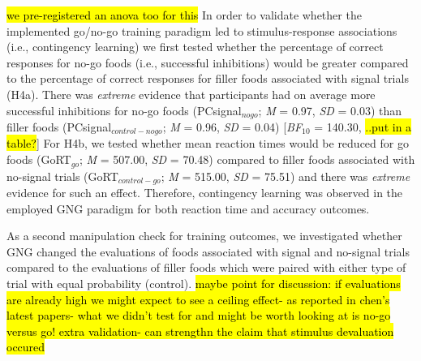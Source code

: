 \documentclass[man,floatsintext]{apa6}
\begin{document}
\par

\hl{we pre-registered an anova too for this} In order to validate
whether the implemented go/no-go training paradigm led to
stimulus-response associations (i.e., contingency learning) we first
tested whether the percentage of correct responses for no-go foods
(i.e., successful inhibitions) would be greater compared to the
percentage of correct responses for filler foods associated with signal
trials (H4a). There was \emph{extreme} evidence that participants had on
average more successful inhibitions for no-go foods
(PCsignal\(_{nogo}\); \emph{M} = 0.97, \emph{SD} = 0.03) than filler
foods (PCsignal\(_{control-nogo}\); \emph{M} = 0.96, \emph{SD} = 0.04)
{[}\emph{BF}\(_{10}\) = 140.30, \hl{..put in a table?}{]} For H4b, we
tested whether mean reaction times would be reduced for go foods
(GoRT\(_{go}\); \emph{M} = 507.00, \emph{SD} = 70.48) compared to filler
foods associated with no-signal trials (GoRT\(_{control-go}\); \emph{M}
= 515.00, \emph{SD} = 75.51) and there was \emph{extreme} evidence for
such an effect. Therefore, contingency learning was observed in the
employed GNG paradigm for both reaction time and accuracy outcomes.

\par

As a second manipulation check for training outcomes, we investigated
whether GNG changed the evaluations of foods associated with signal and
no-signal trials compared to the evaluations of filler foods which were
paired with either type of trial with equal probability (control).
\hl{maybe point for discussion: if evaluations are already high we might expect to see a ceiling effect- as reported in chen's latest papers- what we didn't test for and might be worth looking at is no-go versus go! extra validation- can strengthn the claim that stimulus devaluation occured}
\end{document}
